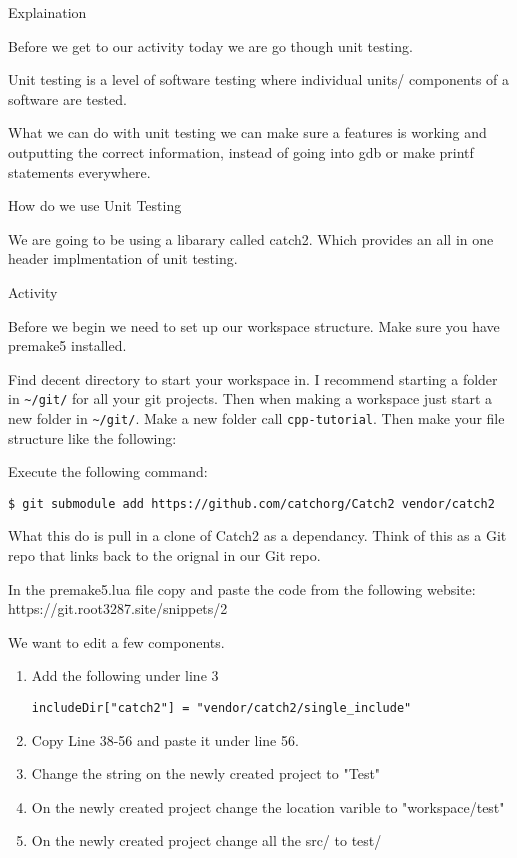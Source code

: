 \documentclass[10pt]{exam}
\begin{document}
{\LARGE Explaination}

Before we get to our activity today we are go though unit testing.

Unit testing is a level of software testing where individual units/ components of a software are tested. 

What we can do with unit testing we can make sure a features is working and outputting the correct information, instead of going into gdb or make printf statements everywhere.

{\Large How do we use Unit Testing}

We are going to be using a libarary called catch2. Which provides an all in one header implmentation of unit testing.

\newpage
{\LARGE Activity}

Before we begin we need to set up our workspace structure. Make sure you have premake5 installed.

Find decent directory to start your workspace in. I recommend starting a folder in \lstinline{~/git/} for all your git projects. Then when making a workspace just start a new folder in \lstinline{~/git/}. Make a new folder call \lstinline{cpp-tutorial}. Then make your file structure like the following:


Execute the following command:

\begin{lstlisting}
$ git submodule add https://github.com/catchorg/Catch2 vendor/catch2
\end{lstlisting}
What this do is pull in a clone of Catch2 as a dependancy. Think of this as a Git repo that links back to the orignal in our Git repo.

In the premake5.lua file copy and paste the code from the following website: https://git.root3287.site/snippets/2

We want to edit a few components.
\begin{enumerate}
\item Add the following under line 3
\begin{lstlisting}
includeDir["catch2"] = "vendor/catch2/single_include"
\end{lstlisting}
\item Copy Line 38-56 and paste it under line 56.
\item Change the string on the newly created project to "Test"
\item On the newly created project change the location varible to "workspace/test"
\item On the newly created project change all the src/ to test/
\end{enumerate}
\end{document}
